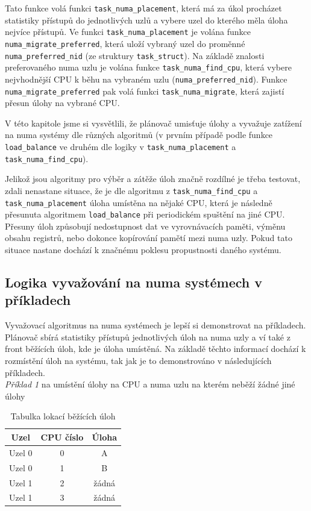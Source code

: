 \documentclass[a4paper,12pt]{article}
\begin{document}
Tato funkce volá funkci \verb#task_numa_placement#, která má za úkol procházet statistiky přístupů do jednotlivých uzlů a vybere uzel do kterého měla úloha nejvíce přístupů. Ve funkci \verb#task_numa_placement# je volána funkce \newline \verb#numa_migrate_preferred#, která uloží vybraný uzel do proměnné \newline \verb#numa_preferred_nid# (ze struktury \verb#task_struct#).
Na základě znalosti preferovaného numa uzlu je volána funkce \verb#task_numa_find_cpu#, která vybere nejvhodnější CPU k běhu na vybraném uzlu (\verb#numa_preferred_nid#).
Funkce \verb#numa_migrate_preferred# pak volá funkci \verb#task_numa_migrate#, která zajistí přesun úlohy na vybrané CPU.

V této kapitole jsme si vysvětlili, že plánovač umisťuje úlohy a vyvažuje zatížení na numa systémy dle různých algoritmů (v prvním případě podle funkce \verb#load_balance# ve druhém dle logiky v \verb#task_numa_placement# a \newline \verb#task_numa_find_cpu#).

Jelikož jsou algoritmy pro výběr a zátěže úloh značně rozdílné je třeba testovat, zdali nenastane situace, že je dle algoritmu z \verb#task_numa_find_cpu# a \verb#task_numa_placement# úloha umístěna na nějaké CPU, která je následně přesunuta algoritmem \verb#load_balance# při periodickém spuštění na jiné CPU. Přesuny úloh způsobují nedostupnost dat ve vyrovnávacích paměti, výměnu obsahu registrů, nebo dokonce kopírování pamětí mezi numa uzly. Pokud tato situace nastane dochází k značnému poklesu propustnosti daného systému. \\ 

\newpage
\subsection{Logika vyvažování na numa systémech v příkladech}
Vyvažovací algoritmus na numa systémech je lepší si demonstrovat na příkladech. Plánovač sbírá statistiky přístupů jednotlivých úloh na numa uzly a ví také z front běžících úloh, kde je úloha umístěná. Na základě těchto informací dochází k rozmístění úloh na systému, tak jak je to demonstrováno v následujících příkladech. \\

\noindent
\textit{Příklad 1} na umístění úlohy na CPU a numa uzlu na kterém neběží žádné jiné úlohy

\begin{table}[h]
\centering
\begin{tabular}{|c|c|c|}
\hline
Uzel & CPU číslo & Úloha \\
\hline
Uzel 0 & 0 & A \\
\hline
Uzel 0 & 1 & B \\
\hline
Uzel 1 & 2 & žádná \\
\hline
Uzel 1 & 3 & žádná \\
\hline
\end{tabular}
\caption{Tabulka lokací běžících úloh}
\label{table2}
\end{table}
\end{document}
